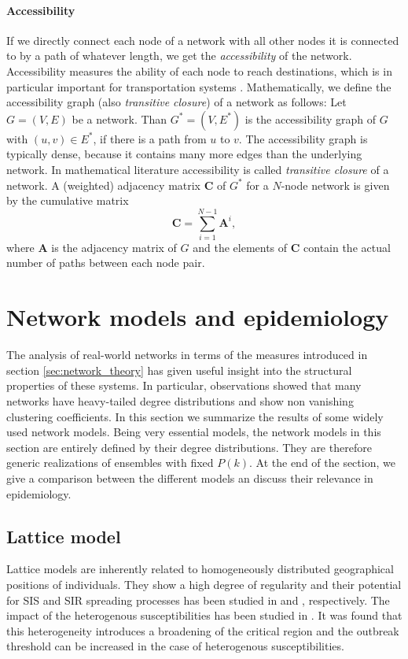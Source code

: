 \paragraph{Accessibility\color{Cayenne}{.}}
If we directly connect each node of a network with all other nodes it is connected to by a path of whatever length, we get the \emph{accessibility} of the network.
Accessibility measures the ability of each node to reach destinations, which is in particular important for transportation systems \citep{Garrison:1960up}.
Mathematically, we define the accessibility graph (also \emph{transitive closure}) of a network as follows:
Let $G=(V,E)$ be a network.
Than $G^*=(V,E^*)$ is the accessibility graph of $G$ with $(u,v) \in E^*$, if there is a path from $u$ to $v$.
The accessibility graph is typically dense, because it contains many more edges than the underlying network.
In mathematical literature accessibility is called \emph{transitive closure} of a network.
A (weighted) adjacency matrix $\mathbf{C}$ of $G^*$ for a $N$-node network is given by the cumulative matrix
\begin{equation}\label{eq:cumulative_matrix}
\mathbf{C}= \sum _{i=1} ^{N-1} \mathbf{A}^i,
\end{equation}
where $\mathbf{A}$ is the adjacency matrix of $G$ and the elements of $\mathbf{C}$ contain the actual number of paths between each node pair.


\section{Network models and epidemiology}\label{sec:network_models}
The analysis of real-world networks in terms of the measures introduced in section \ref{sec:network_theory} has given useful insight into the structural properties of these systems.
In particular, observations showed that many networks have heavy-tailed degree distributions and show non vanishing clustering coefficients.
In this section we summarize the results of some widely used network models.
Being very essential models, the network models in this section are entirely defined by their degree distributions.
They are therefore generic realizations of ensembles with fixed $P(k)$.
At the end of the section, we give a comparison between the different models an discuss their relevance in epidemiology.

\subsection{Lattice model}
Lattice models are inherently related to homogeneously distributed geographical positions of individuals.
They show a high degree of regularity and their potential for SIS and SIR spreading processes has been studied in \citep{Harris:1974} and \citep{Bak:1990}, respectively.
The impact of the heterogenous susceptibilities has been studied in \citep{Sander2002293}.
It was found that this heterogeneity introduces a broadening of the critical region and the outbreak threshold can be increased in the case of heterogenous susceptibilities.


